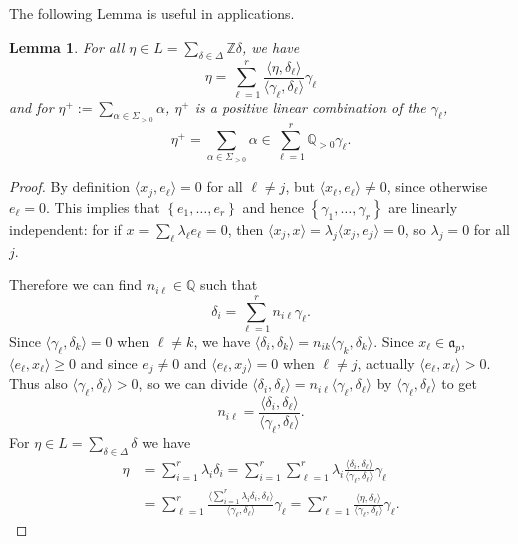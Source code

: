 \documentclass[12pt]{amsart}
\newcommand{\Q}{\mathbb{Q} }
\newcommand{\Z}{\mathbb{Z} }
\newcommand{\fraka}{\mathfrak{a}}
\numberwithin{equation}{section}
\newtheorem{lemma}[theorem]{Lemma}
\theoremstyle{remark} %
\begin{document}
The following Lemma is useful in applications.
\begin{lemma}\label{lem:kostant_gammaalpha}
	For all $\eta \in L = \sum_{\delta \in \Delta} \Z \delta $, we have
	$$
	\eta = \sum_{\ell=1}^r \frac{\langle \eta, \delta_\ell\rangle}{\langle \gamma_\ell,\delta_\ell\rangle} \gamma_\ell
	$$
	and for $\eta^+ := \sum_{\alpha \in \Sigma_{>0}} \alpha$, $\eta^+$ is a positive linear combination of the $\gamma_\ell$,
	$$
	\eta^+ = \sum_{\alpha \in \Sigma_{>0}} \alpha \in \sum_{\ell=1}^r  \Q_{>0} \gamma_\ell.
	$$
\end{lemma}
\begin{proof}
	By definition $\langle x_j, e_\ell \rangle = 0 $ for all $\ell \neq j$, but $\langle x_\ell, e_\ell \rangle \neq 0$, since otherwise $e_\ell = 0$. This implies that $\left\{e_1, \ldots, e_r\right\}$ and hence $\left\{ \gamma_1, \ldots, \gamma_r \right\}$ are linearly independent: for if $x=\sum_\ell \lambda_\ell e_\ell = 0$, then $\langle x_j, x\rangle = \lambda_j \langle x_j,e_j\rangle =0$, so $\lambda_j =0$ for all $j$.
	
	Therefore we can find $n_{i\ell} \in \Q$ such that
	$$
	\delta_i = \sum_{\ell=1 }^r n_{i\ell}\gamma_\ell.
	$$
	Since $\langle \gamma_\ell,\delta_k\rangle = 0 $ when $\ell \neq k$, we have $\langle \delta_i,\delta_k \rangle = n_{ik}\langle \gamma_k, \delta_k \rangle$. Since $x_\ell \in \fraka_p$, $\langle e_\ell,x_\ell\rangle \geq 0$ and since $e_j\neq 0$ and $\langle e_\ell, x_j \rangle = 0$ when $\ell\neq j$, actually $\langle e_\ell, x_\ell\rangle >0$. Thus also $\langle \gamma_\ell,\delta_\ell \rangle >0$, so we can divide $\langle \delta_i , \delta_\ell \rangle = n_{i\ell} \langle \gamma_\ell , \delta_\ell \rangle$ by $\langle \gamma_\ell , \delta_\ell \rangle $ to get
	$$
	n_{i\ell} = \frac{\langle \delta_i ,\delta_\ell \rangle}{\langle \gamma_\ell, \delta_\ell \rangle }.
	$$
	For $\eta \in L = \sum_{\delta \in \Delta} \delta$ we have
	\begin{align*}
		\eta &= \sum_{i=1}^r \lambda_i \delta_i =  \sum_{i=1}^r \sum_{\ell=1}^r \lambda_i \frac{\langle \delta_i ,\delta_\ell \rangle}{\langle \gamma_\ell, \delta_\ell \rangle }  \gamma_\ell \\
		&= \sum_{\ell=1}^r \frac{\langle \sum_{i=1}^r \lambda_i \delta_i, \delta_\ell\rangle}{\langle \gamma_\ell, \delta_\ell \rangle} \gamma_\ell = 
		\sum_{\ell=1}^r \frac{\langle \eta, \delta_\ell \rangle }{\langle \gamma_\ell, \delta_\ell \rangle} \gamma_\ell.
	\end{align*}
	

\end{proof}
\end{document}
